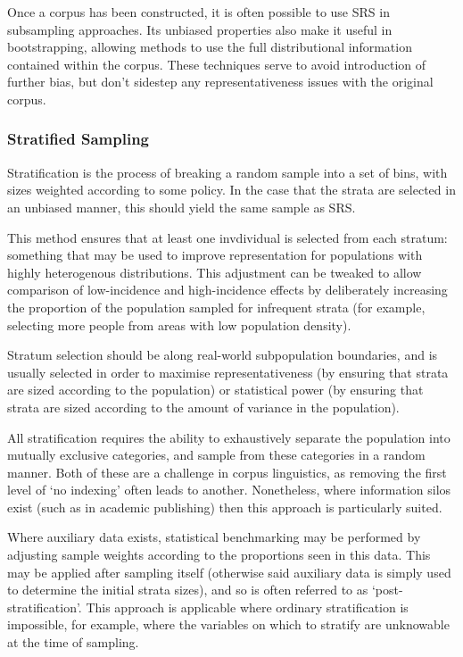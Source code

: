 Once a corpus has been constructed, it is often possible to use SRS in subsampling approaches.  Its unbiased properties also make it useful in bootstrapping, allowing methods to use the full distributional information contained within the corpus.  These techniques serve to avoid introduction of further bias, but don't sidestep any representativeness issues with the original corpus.


\subsubsection{Stratified Sampling}
Stratification is the process of breaking a random sample into a set of bins, with sizes weighted according to some policy.  In the case that the strata are selected in an unbiased manner, this should yield the same sample as SRS.

This method ensures that at least one invdividual is selected from each stratum: something that may be used to improve representation for populations with highly heterogenous distributions.  This adjustment can be tweaked to allow comparison of low-incidence and high-incidence effects by deliberately increasing the proportion of the population sampled for infrequent strata (for example, selecting more people from areas with low population density).

Stratum selection should be along real-world subpopulation boundaries, and is usually selected in order to maximise representativeness (by ensuring that strata are sized according to the population) or statistical power (by ensuring that strata are sized according to the amount of variance in the population).

All stratification requires the ability to exhaustively separate the population into mutually exclusive categories, and sample from these categories in a random manner.  Both of these are a challenge in corpus linguistics, as removing the first level of `no indexing' often leads to another.  Nonetheless, where information silos exist (such as in academic publishing) then this approach is particularly suited.

Where auxiliary data exists, statistical benchmarking may be performed by adjusting sample weights according to the proportions seen in this data.  This may be applied after sampling itself (otherwise said auxiliary data is simply used to determine the initial strata sizes), and so is often referred to as `post-stratification'.  This approach is applicable where ordinary stratification is impossible, for example, where the variables on which to stratify are unknowable at the time of sampling.

